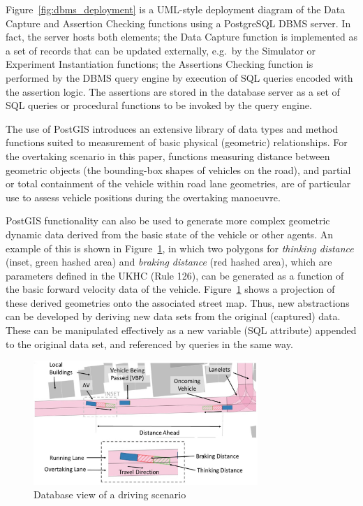 Figure~\ref{fig:dbms_deployment} is a UML-style deployment diagram of the Data Capture and Assertion Checking functions using a PostgreSQL DBMS server. In fact, the server hosts both elements; the Data Capture function is implemented as a set of records that can be updated externally, e.g.\ by the Simulator or Experiment Instantiation functions; the Assertions Checking function is performed by the DBMS query engine by execution of SQL queries encoded with the assertion logic. 
The assertions are stored in the database server as a set of SQL queries or procedural functions to be invoked by the query engine. 

The use of PostGIS introduces an extensive library of data types and method functions suited to measurement of basic physical (geometric) relationships. For the overtaking scenario in this paper, functions measuring distance between geometric objects (the bounding-box shapes of vehicles on the road), and partial or total containment of the vehicle within road lane geometries, are of particular use to assess vehicle positions during the overtaking manoeuvre.

PostGIS functionality can also be used to generate more complex geometric dynamic data derived from the basic state of the vehicle or other agents. An example of this is shown in Figure~\ref{fig:assertion_database_annotated}, in which two polygons for \textit{thinking distance} (inset, green hashed area) and \textit{braking distance} (red hashed area), which are parameters defined in the UKHC (Rule 126), can be generated as a function of the basic forward velocity data of the vehicle. Figure~\ref{fig:assertion_database_annotated} shows a projection of these derived geometries onto the associated street map. 
%
Thus, new abstractions can be developed by deriving new data sets from the original (captured) data. These can be manipulated effectively as a new variable (SQL attribute) appended to the original data set, and referenced by queries in the same way.
%

\begin{figure}[h!]
    \centering
    \includegraphics[width=8.5cm]{../other/figures/Slide5b.jpg}
    \caption{Database view of a driving scenario}
    \label{fig:assertion_database_annotated}
\end{figure}


